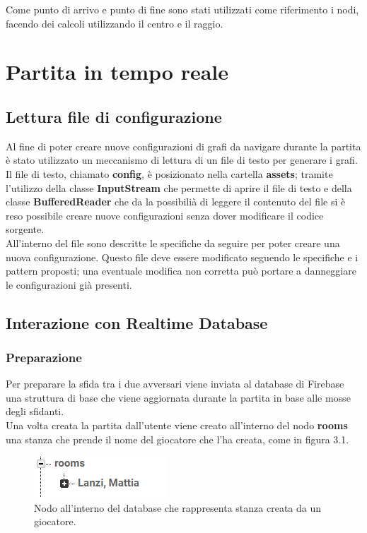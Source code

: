 \documentclass[a4paper,12pt,twoside,openright]{report}
\begin{document}
Come punto di arrivo e punto di fine sono stati utilizzati come riferimento i nodi, facendo dei calcoli utilizzando il centro e il raggio.

\chapter{Partita in tempo reale}
\section{Lettura file di configurazione}
Al fine di poter creare nuove configurazioni di grafi da navigare durante la partita è stato utilizzato un meccanismo di lettura di un file di testo per generare i grafi.\\
Il file di testo, chiamato \textbf{config}, è posizionato nella cartella \textbf{assets}; tramite l'utilizzo della classe \textbf{InputStream} che permette di aprire il file di testo e della classe \textbf{BufferedReader} che da la possibilià di leggere il contenuto del file si è reso possibile creare nuove configurazioni senza dover modificare il codice sorgente.\\
All'interno del file sono descritte le specifiche da seguire per poter creare una nuova configurazione. Questo file deve essere modificato seguendo le specifiche e i pattern proposti; una eventuale modifica non corretta può portare a danneggiare le configurazioni già presenti.\\

\section{Interazione con Realtime Database}
\subsection{Preparazione}
Per preparare la sfida tra i due avversari viene inviata al database di Firebase una struttura di base che viene aggiornata durante la partita in base alle mosse degli sfidanti.\\
Una volta creata la partita dall'utente viene creato all'interno del nodo \textbf{rooms} una stanza che prende il nome del giocatore che l'ha creata, come in figura 3.1.\\
\begin{figure}[h]
\includegraphics{images/Room node.png}
\caption{Nodo all'interno del database che rappresenta stanza creata da un giocatore.}
\end{figure}
\end{document}
